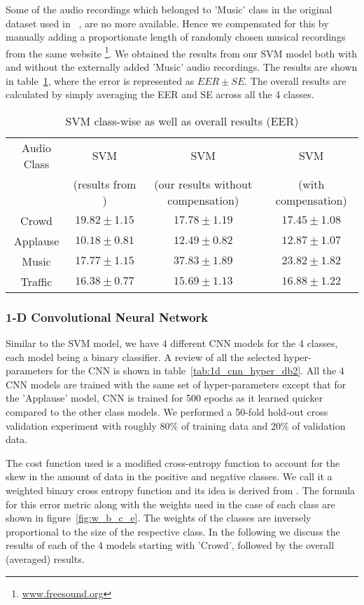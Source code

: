 Some of the audio recordings which belonged to 'Music' class in the original dataset used in ~\cite{kons2013audio}, are no more available. Hence we compensated for this by manually adding a proportionate length of randomly chosen musical recordings from the same website \footnote{\url{www.freesound.org}}. We obtained the results from our SVM model both with and without the externally added 'Music' audio recordings. The results are shown in table~\ref{tab:svm_db2}, where the error is represented as $EER \pm SE$. The overall results are calculated by simply averaging the EER and SE across all the 4 classes.

\begin{table}[tb]
\caption[SVM Results DB2]{SVM class-wise as well as overall results (EER)}
\label{tab:svm_db2}
\centering
\begin{tabular}{cccc}
\toprule
Audio Class & SVM  & SVM & SVM  \\
& (results from \cite{kons2013audio}) & (our results without compensation) & (with compensation) \\
\midrule
Crowd	& $19.82 \pm 1.15$ & $17.78 \pm 1.19$ & $17.45 \pm 1.08$ \\
Applause	& $10.18 \pm 0.81$ & $12.49 \pm 0.82$ & $12.87 \pm 1.07$ \\
Music	& $17.77 \pm 1.15$ & $37.83 \pm 1.89$ & $23.82 \pm 1.82$  \\
Traffic	& $16.38 \pm 0.77$ & $15.69 \pm 1.13$ & $16.88 \pm 1.22$  \\
\bottomrule 
\end{tabular}
\end{table}

\subsubsection{1-D Convolutional Neural Network} \label{cnn_results_db2}
Similar to the SVM model, we have 4 different CNN models for the 4 classes, each model being a binary classifier. A review of all the selected hyper-parameters for the CNN is shown in table~\ref{tab:1d_cnn_hyper_db2}. All the 4 CNN models are trained with the same set of hyper-parameters except that for the 'Applause' model, CNN is trained for 500 epochs as it learned quicker compared to the other class models. We performed a 50-fold hold-out cross validation experiment with roughly 80\% of training data and 20\% of validation data.

The cost function used is a modified cross-entropy function to account for the skew in the amount of data in the positive and negative classes. We call it a weighted binary cross entropy function and its idea is derived from \cite{kons2013audio}. The formula for this error metric along with the weights used in the case of each class are shown in figure~\ref{fig:w_b_c_e}. The weights of the classes are inversely proportional to the size of the respective class. In the following we discuss the results of each of the 4 models starting with 'Crowd', followed by the overall (averaged) results.

